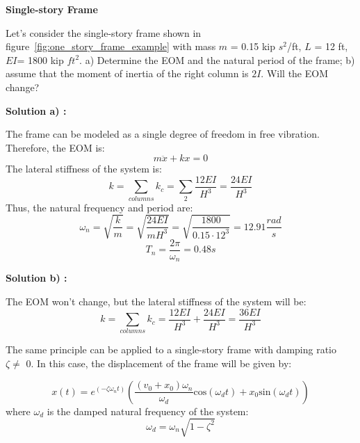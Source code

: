 \documentclass[12pt,letter]{article}
\begin{document}
\begin{example}

\textbf{Single-story Frame}
	
\noindent Let's consider the single-story frame shown in figure~\ref{fig:one_story_frame_example} with mass $m$ = 0.15 kip $s^2$/ft, $L$ = 12 ft, $EI$= 1800 kip $ft^2$. a) Determine the EOM and the natural period of the frame; b) assume that the moment of inertia of the right column is $2I$. Will the EOM change? 

\noindent \textbf{Solution a) :} 

\noindent The frame can be modeled as a single degree of freedom in free vibration. Therefore, the EOM is:
\begin{equation}
	m \ddot{x} + k x = 0
\end{equation}
The lateral stiffness of the system is:
\begin{equation}
k = \sum_{columns}^{} k_c = \sum_{2}^{} \frac{12EI} {H^3} = \frac{24 EI}{H^3}
\end{equation}
Thus, the natural frequency and period are:
\begin{equation}
\omega_n = \sqrt{\frac{k}{m}} = \sqrt{\frac{24 EI}{m H^3}} = \sqrt{\frac{1800}{0.15 \cdot 12^3}} = 12.91 \frac{rad}{s}
\end{equation}
\begin{equation}
T_n =\frac{2 \pi}{\omega_n} = 0.48 s
\end{equation} 

\noindent \textbf{Solution b) :} 

\noindent The EOM won't change, but the lateral stiffness of the system will be: 
\begin{equation}
k = \sum_{columns}^{} k_c = \frac{12EI} {H^3} + \frac{24EI} {H^3} = \frac{36 EI}{H^3}
\end{equation}

\end{example}



The same principle can be applied to a single-story frame with damping ratio $\zeta \neq$ 0. In this case, the displacement of the frame will be given by:

\begin{equation}
x(t) = e^{(-\zeta\omega_nt)} \left( \frac{({v_0} + x_0)\omega_n}{\omega_d} \text{cos}(\omega_d t) + x_0 \text{sin}(\omega_dt) \right)
\end{equation} 
where $\omega_d$ is the damped natural frequency of the system:
\begin{equation}
\omega_d = \omega_n \sqrt{1 - \zeta^2}
\end{equation}
\end{document}
